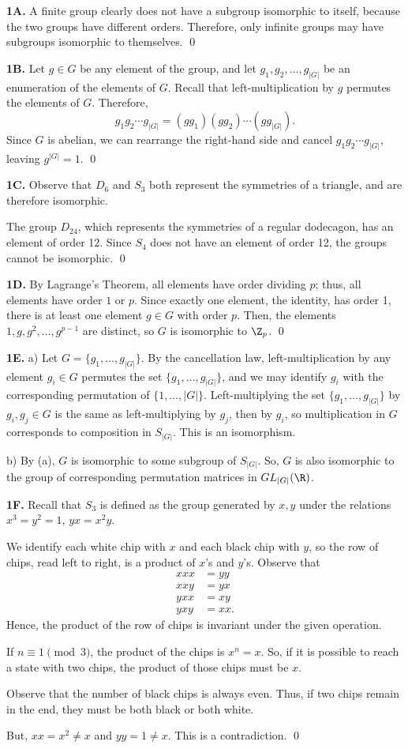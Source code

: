 \noindent\textbf{1A.}  A finite group clearly does not have a subgroup isomorphic to itself, because the two groups have different orders.  Therefore, only infinite groups may have subgroups isomorphic to themselves.  \qed

\noindent\textbf{1B.}  Let $g\in G$ be any element of the group, and let $g_1,g_2,\dots,g_{|G|}$ be an enumeration of the elements of $G$.  Recall that left-multiplication by $g$ permutes the elements of $G$.  Therefore, 
\[g_1g_2\cdots g_{|G|}=(gg_1)(gg_2)\cdots (gg_{|G|}).\]
Since $G$ is abelian, we can rearrange the right-hand side and cancel $g_1g_2\cdots g_{|G|}$, leaving $g^{|G|}=1$.  \qed

\noindent\textbf{1C.}  Observe that $D_6$ and $S_3$ both represent the symmetries of a triangle, and are therefore isomorphic. 

The group $D_{24}$, which represents the symmetries of a regular dodecagon, has an element of order 12.  Since $S_4$ does not have an element of order 12, the groups cannot be isomorphic. \qed 

\noindent\textbf{1D.}  By Lagrange's Theorem, all elements have order dividing $p$; thus, all elements have order $1$ or $p$.  Since exactly one element, the identity, has order 1, there is at least one element $g\in G$ with order $p$.  Then, the elements $1,g,g^2,\dots,g^{p-1}$ are distinct, so $G$ is isomorphic to $\Z_p$.  \qed

\noindent\textbf{1E.}  a) Let $G=\{g_1, \dots, g_{|G|}\}$.  By the cancellation law, left-multiplication by any element $g_i\in G$ permutes the set $\{g_1,\dots,g_{|G|}\}$, and we may identify $g_i$ with the corresponding permutation of $\{1,\dots,|G|\}$.  Left-multiplying the set $\{g_1,\dots,g_{|G|}\}$ by $g_i,g_j\in G$ is the same as left-multiplying by $g_j$, then by $g_i$, so multiplication in $G$ corresponds to composition in $S_{|G|}$.  This is an isomorphism.  

b) By (a), $G$ is isomorphic to some subgroup of $S_{|G|}$.  So, $G$ is also isomorphic to the group of corresponding permutation matrices in $GL_{|G|}(\R)$.  

\noindent\textbf{1F.}  Recall that $S_3$ is defined as the group generated by $x,y$ under the relations $x^3=y^2=1$, $yx=x^2y$.  

We identify each white chip with $x$ and each black chip with $y$, so the row of chips, read left to right, is a product of $x$'s and $y$'s.  Observe that 
\begin{align*}
xxx&=yy\\
xxy&=yx\\
yxx&=xy\\
yxy&=xx.
\end{align*}
Hence, the product of the row of chips is invariant under the given operation.  

If $n\equiv 1\pmod 3$, the product of the chips is $x^n=x$.  So, if it is possible to reach a state with two chips, the product of those chips must be $x$.  

Observe that the number of black chips is always even.  Thus, if two chips remain in the end, they must be both black or both white.  

But, $xx=x^2\neq x$ and $yy=1\neq x$.  This is a contradiction.  \qed